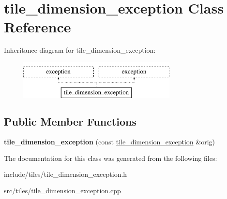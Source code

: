 \hypertarget{classtile__dimension__exception}{\section{tile\-\_\-dimension\-\_\-exception Class Reference}
\label{classtile__dimension__exception}
}
Inheritance diagram for tile\-\_\-dimension\-\_\-exception\-:\begin{figure}[H]
\begin{center}
\leavevmode
\includegraphics[height=2.000000cm]{classtile__dimension__exception}
\end{center}
\end{figure}
\subsection*{Public Member Functions}
\begin{DoxyCompactItemize}
\item 
\hypertarget{classtile__dimension__exception_a7cae08a286633c5ff8a4acc7194f4da3}{{\bfseries tile\-\_\-dimension\-\_\-exception} (const \hyperlink{classtile__dimension__exception}{tile\-\_\-dimension\-\_\-exception} \&orig)}\label{classtile__dimension__exception_a7cae08a286633c5ff8a4acc7194f4da3}

\end{DoxyCompactItemize}


The documentation for this class was generated from the following files\-:\begin{DoxyCompactItemize}
\item 
include/tiles/tile\-\_\-dimension\-\_\-exception.\-h\item 
src/tiles/tile\-\_\-dimension\-\_\-exception.\-cpp\end{DoxyCompactItemize}
